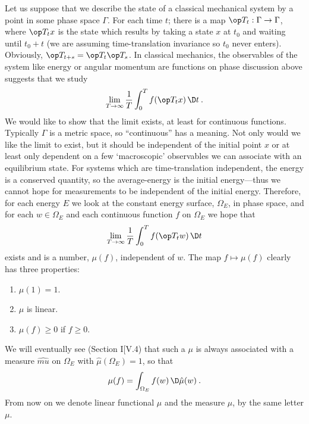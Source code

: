 Let us suppose that we describe the state of a classical mechanical system
by a point in some phase space $\Gamma$. For each time $t$; there is a map $\op T_t : \Gamma \to \Gamma$, where $\op T_t x$ is the state which results by taking a state $x$ at $t_0$ and waiting until $t_0 + t$ (we are assuming time-translation invariance so $t_0$ never enters).
Obviously, $\op T_{t+s} = \op T_t \op T_s$. In classical mechanics, the observables of the system like energy or angular momentum are functions on phase discussion above suggests that we study
\begin{align}
    \lim_{T \rightarrow \infty} \frac{1}{T} \int_0^T f(\op T_t x) \, \D t \:.
\end{align}
We would like to show that the limit exists, at least for continuous functions. Typically $\Gamma$ is a metric space, so \enquote{continuous} has a meaning. Not only would we like the limit to exist, but it should be independent of the initial point $x$ or at least only dependent on a few \enquote*{macroscopic} observables we can associate with an equilibrium state. For systems which are time-translation independent, the energy is a conserved quantity, so the average-energy is the initial energy—thus we cannot hope for measurements to be independent of the initial energy. Therefore, for each energy $E$ we look at the constant energy surface, $\Omega_E$, in phase space, and for each  $w \in \Omega_E$ and each continuous function $f$ on $\Omega_E$ we hope that
\begin{align}
    \lim_{T \rightarrow \infty} \frac{1}{T} \int_0^T f(\op T_t w) \, \D t
\end{align}
exists and is a number, $\mu(f)$, independent of $w$. The map $f \mapsto \mu(f)$ clearly has three properties:
\begin{enumerate}
    \item $\mu(1)=1$.
    \item $\mu$ is linear.
    \item $\mu(f) \geq 0$ if $f \geq 0$.
\end{enumerate}
We will eventually see (Section I[V.4) that such a $\mu$ is always associated with a measure $\hat{mu}$ on $\Omega_E$ with $\hat{\mu}(\Omega_E) = 1$, so that
\begin{align}
    \mu(f) = \int_{\Omega_E} f(w) \, \D \hat{\mu}(w) \:.
\end{align}
From now on we denote linear functional $\mu$ and the measure $\hat{\mu}$, by the same letter $\mu$.

